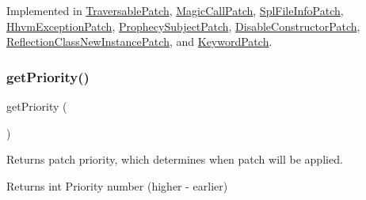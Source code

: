 Implemented in \mbox{\hyperlink{class_prophecy_1_1_doubler_1_1_class_patch_1_1_traversable_patch_a62fdb697928f35fc782d6889b8fe9b8b}{Traversable\+Patch}}, \mbox{\hyperlink{class_prophecy_1_1_doubler_1_1_class_patch_1_1_magic_call_patch_a62fdb697928f35fc782d6889b8fe9b8b}{Magic\+Call\+Patch}}, \mbox{\hyperlink{class_prophecy_1_1_doubler_1_1_class_patch_1_1_spl_file_info_patch_a62fdb697928f35fc782d6889b8fe9b8b}{Spl\+File\+Info\+Patch}}, \mbox{\hyperlink{class_prophecy_1_1_doubler_1_1_class_patch_1_1_hhvm_exception_patch_a62fdb697928f35fc782d6889b8fe9b8b}{Hhvm\+Exception\+Patch}}, \mbox{\hyperlink{class_prophecy_1_1_doubler_1_1_class_patch_1_1_prophecy_subject_patch_a62fdb697928f35fc782d6889b8fe9b8b}{Prophecy\+Subject\+Patch}}, \mbox{\hyperlink{class_prophecy_1_1_doubler_1_1_class_patch_1_1_disable_constructor_patch_a62fdb697928f35fc782d6889b8fe9b8b}{Disable\+Constructor\+Patch}}, \mbox{\hyperlink{class_prophecy_1_1_doubler_1_1_class_patch_1_1_reflection_class_new_instance_patch_a62fdb697928f35fc782d6889b8fe9b8b}{Reflection\+Class\+New\+Instance\+Patch}}, and \mbox{\hyperlink{class_prophecy_1_1_doubler_1_1_class_patch_1_1_keyword_patch_a62fdb697928f35fc782d6889b8fe9b8b}{Keyword\+Patch}}.

\mbox{\label{interface_prophecy_1_1_doubler_1_1_class_patch_1_1_class_patch_interface_a1e7a3c168dcd0901a0d2669c67575b55}} 
\subsubsection{\texorpdfstring{get\+Priority()}{getPriority()}}
{\footnotesize\ttfamily get\+Priority (\begin{DoxyParamCaption}{ }\end{DoxyParamCaption})}

Returns patch priority, which determines when patch will be applied.

\begin{DoxyReturn}{Returns}
int Priority number (higher -\/ earlier) 
\end{DoxyReturn}


